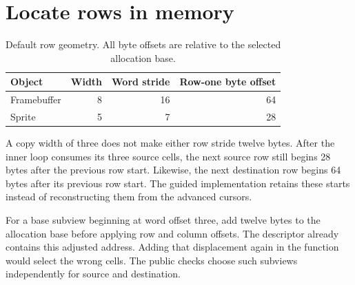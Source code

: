 \section{Locate rows in memory}\label{blit-x-layout}
\begin{table}[htbp]
  \centering
  \caption{Default row geometry. All byte offsets are relative to the selected allocation base.}
  \begin{tabular}{lrrr}
    \toprule
    Object      & Width & Word stride & Row-one byte offset \\
    \midrule
    Framebuffer & 8     & 16          & 64                  \\
    Sprite      & 5     & 7           & 28                  \\
    \bottomrule
  \end{tabular}
\end{table}
A copy width of three does not make either row stride twelve bytes. After the
inner loop consumes its three source cells, the next source row still begins
28 bytes after the previous row start. Likewise, the next destination row
begins 64 bytes after its previous row start. The guided implementation retains
these starts instead of reconstructing them from the advanced cursors.

For a base subview beginning at word offset three, add twelve bytes to the
allocation base before applying row and column offsets. The descriptor already
contains this adjusted address. Adding that displacement again in the function
would select the wrong cells. The public checks choose such subviews independently
for source and destination.
